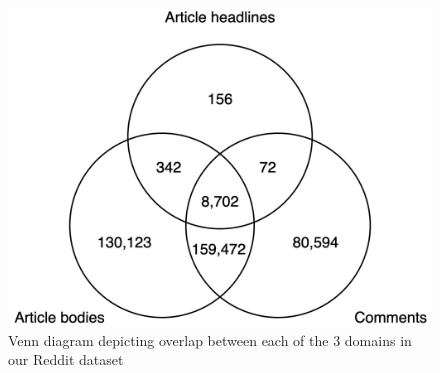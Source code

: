 \begin{figure}[ht]
    \centering
    \includegraphics[scale=0.23]{0-img/vocab-venn-diagram.png}
    \caption{Venn diagram depicting overlap between each of the 3 domains in our Reddit dataset}
    \label{fig:vocab-venn-diagram}
\end{figure}